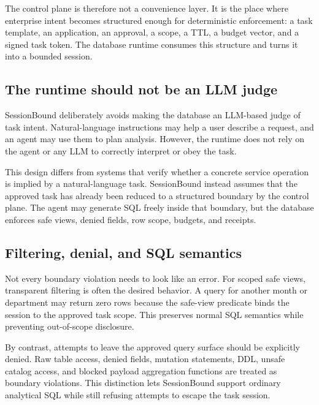 \documentclass[
]{article}
\begin{document}
The control plane is therefore not a convenience layer. It is the place
where enterprise intent becomes structured enough for deterministic
enforcement: a task template, an application, an approval, a scope, a
TTL, a budget vector, and a signed task token. The database runtime
consumes this structure and turns it into a bounded session.

\hypertarget{the-runtime-should-not-be-an-llm-judge}{%
\subsection{The runtime should not be an LLM
judge}\label{the-runtime-should-not-be-an-llm-judge}}

SessionBound deliberately avoids making the database an LLM-based judge
of task intent. Natural-language instructions may help a user describe a
request, and an agent may use them to plan analysis. However, the
runtime does not rely on the agent or any LLM to correctly interpret or
obey the task.

This design differs from systems that verify whether a concrete service
operation is implied by a natural-language task. SessionBound instead
assumes that the approved task has already been reduced to a structured
boundary by the control plane. The agent may generate SQL freely inside
that boundary, but the database enforces safe views, denied fields, row
scope, budgets, and receipts.

\hypertarget{filtering-denial-and-sql-semantics}{%
\subsection{Filtering, denial, and SQL
semantics}\label{filtering-denial-and-sql-semantics}}

Not every boundary violation needs to look like an error. For scoped
safe views, transparent filtering is often the desired behavior. A query
for another month or department may return zero rows because the
safe-view predicate binds the session to the approved task scope. This
preserves normal SQL semantics while preventing out-of-scope disclosure.

By contrast, attempts to leave the approved query surface should be
explicitly denied. Raw table access, denied fields, mutation statements,
DDL, unsafe catalog access, and blocked payload aggregation functions
are treated as boundary violations. This distinction lets SessionBound
support ordinary analytical SQL while still refusing attempts to escape
the task session.
\end{document}
